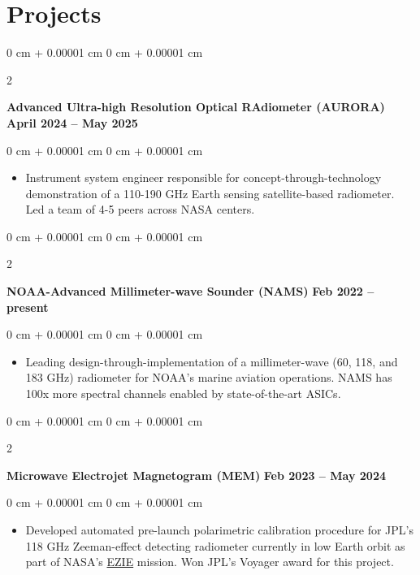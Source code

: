 \documentclass[10pt, letterpaper]{article}
\newenvironment{highlights}{
    \begin{itemize}[
        topsep=0.10 cm,
        parsep=0.10 cm,
        partopsep=0pt,
        itemsep=0pt,
        leftmargin=0 cm + 10pt     
    ]
}{
    \end{itemize}
} %
\newenvironment{onecolentry}{
    \begin{adjustwidth}{
        0 cm + 0.00001 cm
    }{
        0 cm + 0.00001 cm
    }
}{
    \end{adjustwidth}
} %
\newenvironment{twocolentry}[2][]{
    \onecolentry
    \def\secondColumn{#2}
    \setcolumnwidth{\fill, 4.5 cm}
    \begin{paracol}{2}
}{
    \switchcolumn \raggedleft \secondColumn
    \end{paracol}
    \endonecolentry
} %
\begin{document}
    \section{Projects}
       \justifying
        \begin{twocolentry}{
            \textbf{April 2024 -- May 2025}
        }
            \textbf{Advanced Ultra-high Resolution Optical RAdiometer (AURORA)}\end{twocolentry}

        \vspace{0.20 cm}
        \begin{onecolentry}
            \begin{highlights}
                \item Instrument system engineer responsible for concept-through-technology demonstration of a 110-190 GHz Earth sensing satellite-based radiometer. Led a team of 4-5 peers across NASA centers.
            \end{highlights}
        \end{onecolentry}
        \vspace{0.3 cm}

        \begin{twocolentry}{
            \textbf{Feb 2022 -- present}
        }
            \textbf{NOAA-Advanced Millimeter-wave Sounder (NAMS)}\end{twocolentry}

        \vspace{0.20 cm}
        \begin{onecolentry}
            \begin{highlights}
                \item Leading design-through-implementation  of a millimeter-wave (60, 118, and 183 GHz) radiometer for NOAA's marine aviation operations. NAMS has 100x more spectral channels enabled by state-of-the-art ASICs. 
            \end{highlights}
        \end{onecolentry}
        \vspace{0.3 cm}

        \begin{twocolentry}{
            \textbf{Feb 2023 -- May 2024}
        }
            \textbf{Microwave Electrojet Magnetogram (MEM)}\end{twocolentry}

        \vspace{0.20 cm}
        \begin{onecolentry}
            \begin{highlights}
                \item Developed automated pre-launch polarimetric calibration procedure for JPL's 118 GHz Zeeman-effect detecting radiometer currently in low Earth orbit as part of NASA's  \href{https://science.nasa.gov/mission/ezie/}{EZIE} mission. Won JPL's Voyager award for this project.              
            \end{highlights}
        \end{onecolentry}
        \vspace{0.3cm}
        
\end{document}
